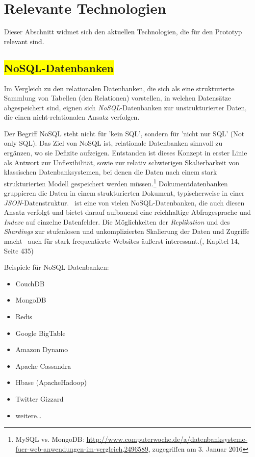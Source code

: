 \section{Relevante Technologien}

Dieser Abschnitt widmet sich den aktuellen Technologien, die für den Prototyp relevant sind.

\subsection{\colorbox{yellow}{NoSQL-Datenbanken}}

Im Vergleich zu den relationalen Datenbanken, die sich als eine strukturierte Sammlung von Tabellen (den Relationen) vorstellen, in welchen Datensätze abgespeichert sind, eignen sich \textit{NoSQL}-Datenbanken zur unstrukturierter Daten, die einen nicht-relationalen Ansatz verfolgen. 

Der Begriff NoSQL steht nicht für 'kein SQL', sondern für 'nicht nur SQL' (Not only SQL). Das Ziel von NoSQL ist, relationale Datenbanken sinnvoll zu ergänzen, wo sie Defizite aufzeigen. Entstanden ist dieses Konzept in erster Linie als Antwort zur Unflexibilität, sowie zur relativ schwierigen Skalierbarkeit von klassischen Datenbanksystemen, bei denen die Daten nach einem stark strukturierten Modell gespeichert werden müssen.\footnote{MySQL vs. MongoDB: \url{http://www.computerwoche.de/a/datenbanksysteme-fuer-web-anwendungen-im-vergleich,2496589}, zugegriffen am 3. Januar 2016} Dokumentdatenbanken gruppieren die Daten in einem strukturierten Dokument, typischerweise in einer \textit{JSON}-Datenstruktur. \mongo\ ist eine von vielen NoSQL-Datenbanken, die auch diesen Ansatz verfolgt und bietet darauf aufbauend eine reichhaltige Abfragesprache und \textit{Indexe} auf einzelne Datenfelder. Die Möglichkeiten der \textit{Replikation} und des \textit{Shardings} zur stufenlosen und unkomplizierten Skalierung der Daten und Zugriffe macht \mongo\ auch für stark frequentierte Websites äußerst interessant.(\cite{Hollosi.2012}, Kapitel 14, Seite 435)

Beispiele für NoSQL-Datenbanken:
\begin{multicols}{2}
\begin{itemize}
\item CouchDB
\item MongoDB
\item Redis
\item Google BigTable
\item Amazon Dynamo
\item Apache Cassandra
\item Hbase (ApacheHadoop)
\item Twitter Gizzard
\item weitere…
\end{itemize}
\end{multicols}

